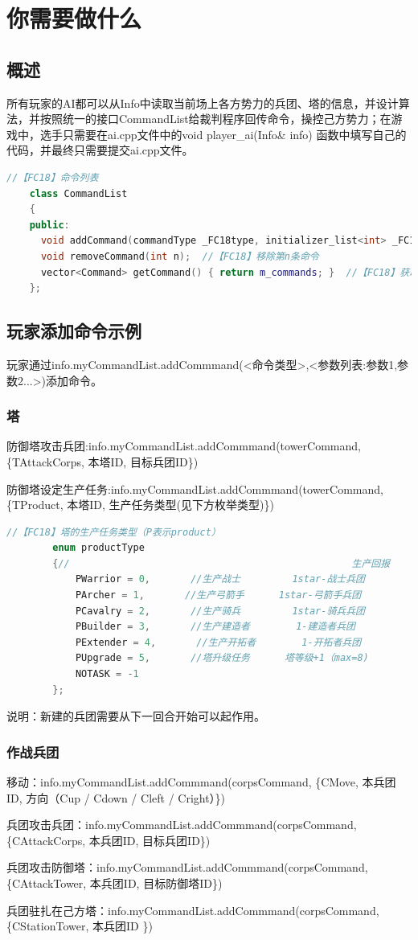 \documentclass[a4paper,4pt]{article}
\begin{document}
\section{你需要做什么}
\subsection{概述}
所有玩家的AI都可以从Info中读取当前场上各方势力的兵团、塔的信息，并设计算法，并按照统一的接口CommandList给裁判程序回传命令，操控己方势力；在游戏中，选手只需要在ai.cpp文件中的void player\_ai(Info\& info) {  }函数中填写自己的代码，并最终只需要提交ai.cpp文件。
\begin{lstlisting}[language={C++},title={添加命令有关代码}]  %插入代码块
    //【FC18】命令列表
    class CommandList
    {
    public:
      void addCommand(commandType _FC18type, initializer_list<int> _FC18parameters);
      void removeCommand(int n);  //【FC18】移除第n条命令
      vector<Command> getCommand() { return m_commands; }  //【FC18】获取所有命令
    };
\end{lstlisting}

\subsection{玩家添加命令示例}
玩家通过info.myCommandList.addCommmand(<命令类型>,<参数列表:参数1,参数2...>)添加命令。
\subsubsection{塔}
防御塔攻击兵团:info.myCommandList.addCommmand(towerCommand, \{TAttackCorps, 本塔ID, 目标兵团ID\})\par
防御塔设定生产任务:info.myCommandList.addCommmand(towerCommand, \{TProduct, 本塔ID, 生产任务类型(见下方枚举类型)\})\par
\begin{lstlisting}[language={C++},title={生产任务类型}]  %插入代码块
		//【FC18】塔的生产任务类型（P表示product）
		enum productType
		{//                                                 生产回报
			PWarrior = 0,       //生产战士         1star-战士兵团
			PArcher = 1,       //生产弓箭手      1star-弓箭手兵团
			PCavalry = 2,       //生产骑兵         1star-骑兵兵团
			PBuilder = 3,       //生产建造者        1-建造者兵团
			PExtender = 4,       //生产开拓者        1-开拓者兵团
			PUpgrade = 5,       //塔升级任务      塔等级+1（max=8)
			NOTASK = -1
		};
\end{lstlisting}
说明：新建的兵团需要从下一回合开始可以起作用。
\subsubsection{作战兵团}
移动：info.myCommandList.addCommmand(corpsCommand, \{CMove, 本兵团ID, 方向（Cup / Cdown / Cleft / Cright）\})\par
兵团攻击兵团：info.myCommandList.addCommmand(corpsCommand, \{CAttackCorps, 本兵团ID, 目标兵团ID\})\par
兵团攻击防御塔：info.myCommandList.addCommmand(corpsCommand, \{CAttackTower, 本兵团ID, 目标防御塔ID\})\par
兵团驻扎在己方塔：info.myCommandList.addCommmand(corpsCommand, \{CStationTower, 本兵团ID \}) \par
\end{document}
